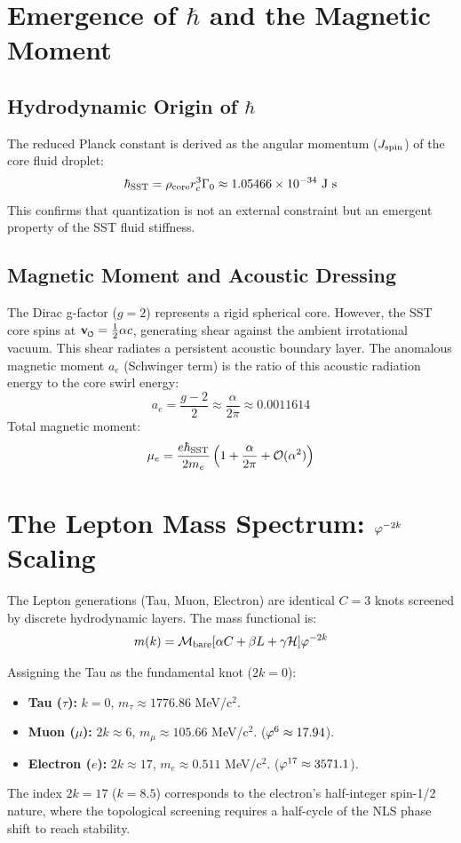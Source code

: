 \documentclass[11pt]{article}
\newcommand{\vswirl}{\mathbf{v}_{\mkern-2mu\scriptscriptstyle\boldsymbol{\circlearrowleft}}}
\newcommand{\rc}{r_c}                                    %
\newcommand{\rhocore}{\rho_{\text{core}}}
\begin{document}
\section{Emergence of $\hbar$ and the Magnetic Moment}
\subsection{Hydrodynamic Origin of $\hbar$}
The reduced Planck constant is derived as the angular momentum ($J_{\rm spin}$) of the core fluid droplet:
\begin{equation}
    \hbar_{\rm SST} = \rhocore \rc^3 \Gammazero \approx 1.05466 \times 10^{-34} \text{ J s}
\end{equation}
This confirms that quantization is not an external constraint but an emergent property of the SST fluid stiffness.

\subsection{Magnetic Moment and Acoustic Dressing}
The Dirac g-factor ($g=2$) represents a rigid spherical core. However, the SST core spins at $\vswirl = \frac{1}{2}\alpha c$, generating shear against the ambient irrotational vacuum. This shear radiates a persistent acoustic boundary layer.
The anomalous magnetic moment $a_e$ (Schwinger term) is the ratio of this acoustic radiation energy to the core swirl energy:
\begin{equation}
    a_e = \frac{g-2}{2} \approx \frac{\alpha}{2\pi} \approx 0.0011614
\end{equation}
Total magnetic moment:
\begin{equation}
    \mu_e = \frac{e \hbar_{\rm SST}}{2m_e} \left( 1 + \frac{\alpha}{2\pi} + \mathcal{O}(\alpha^2) \right)
\end{equation}


\section{The Lepton Mass Spectrum: $\varphi^{-2k}$ Scaling}
The Lepton generations (Tau, Muon, Electron) are identical $C=3$ knots screened by discrete hydrodynamic layers. The mass functional is:
\begin{equation}
    m(k) = \mathcal{M}_{\rm bare} [\alpha C + \beta L + \gamma \mathcal{H}] \varphi^{-2k}
\end{equation}

Assigning the Tau as the fundamental knot ($2k=0$):
\begin{itemize}
    \item \textbf{Tau ($\tau$):} $k=0$, $m_\tau \approx 1776.86$ MeV/c$^2$.
    \item \textbf{Muon ($\mu$):} $2k \approx 6$, $m_\mu \approx 105.66$ MeV/c$^2$. ($\varphi^6 \approx 17.94$).
    \item \textbf{Electron ($e$):} $2k \approx 17$, $m_e \approx 0.511$ MeV/c$^2$. ($\varphi^{17} \approx 3571.1$).
\end{itemize}
The index $2k=17$ ($k=8.5$) corresponds to the electron's half-integer spin-1/2 nature, where the topological screening requires a half-cycle of the NLS phase shift to reach stability.
\end{document}
